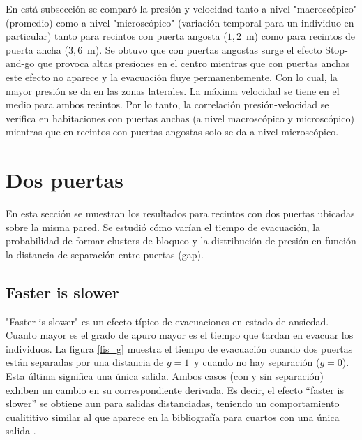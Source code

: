 En está subsección se comparó la presión y velocidad tanto a nivel "macroscópico" (promedio) como a nivel "microscópico" (variación temporal para un individuo en particular) tanto para recintos con puerta angosta ($1,2$~m) como para recintos de puerta ancha ($3,6$~m). Se obtuvo que con puertas angostas surge el efecto Stop-and-go que provoca altas presiones en el centro mientras que con puertas anchas este efecto no aparece y la evacuación fluye permanentemente. Con lo cual, la mayor presión se da en las zonas laterales. La máxima velocidad se tiene en el medio para ambos recintos. Por lo tanto, la correlación presión-velocidad se verifica en habitaciones con puertas anchas (a nivel macroscópico y microscópico) mientras que en recintos con puertas angostas solo se da a nivel microscópico.  


\section{Dos puertas}

En esta sección se muestran los resultados para recintos con dos puertas ubicadas sobre la misma pared. Se estudió cómo varían el tiempo de evacuación, la probabilidad de formar clusters de bloqueo y la distribución de presión en función la distancia de separación entre puertas (gap).  

\subsection{Faster is slower}

"Faster is slower" es un efecto típico de evacuaciones en estado de ansiedad. Cuanto mayor es el grado de apuro mayor es el tiempo que tardan en evacuar los individuos. 
La figura \ref{fis_g} muestra el tiempo de evacuación cuando dos puertas están separadas por una distancia de $g=1\,$ 
y cuando no hay separación ($g=0$). Esta última significa una única salida. Ambos casos (con y sin separación) exhiben un cambio en su correspondiente derivada. Es decir, el efecto ``faster is slower'' se obtiene aun para salidas distanciadas, teniendo un comportamiento cualititivo similar al que aparece en la bibliografía para cuartos con una única salida \cite{Helbing1,Dorso1}.\\ 


